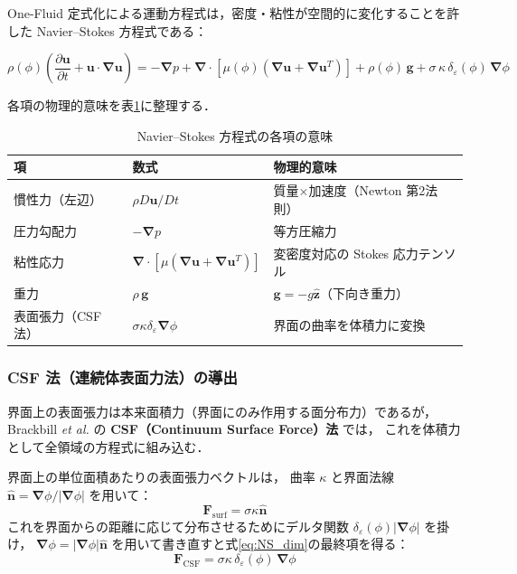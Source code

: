 \documentclass[12pt, a4paper, titlepage]{article}
\newcommand{\jp}[1]{{\normalfont\jpfont #1}}
\newcommand{\pd}[2]{\dfrac{\partial #1}{\partial #2}}
\newcommand{\bu}{\bm{u}}
\newcommand{\bg}{\bm{g}}
\newcommand{\bnabla}{\bm{\nabla}}
\newcommand{\de}{\delta_\varepsilon}
\begin{document}
\jp{One-Fluid 定式化による運動方程式は，密度・粘性が空間的に変化することを許した
Navier--Stokes 方程式である：}

\begin{tcolorbox}[mybox, title={\jp{One-Fluid Navier--Stokes 方程式（次元形）}}]
\begin{equation}
  \rho(\phi)\!\left(\pd{\bu}{t} + \bu\cdot\bnabla\bu\right)
  = -\bnabla p
  + \bnabla\cdot\!\left[\mu(\phi)\!\left(\bnabla\bu + \bnabla\bu^T\right)\right]
  + \rho(\phi)\,\bg
  + \sigma\,\kappa\,\de(\phi)\,\bnabla\phi
  \label{eq:NS_dim}
\end{equation}
\end{tcolorbox}

\jp{各項の物理的意味を表\ref{tab:NS_terms}に整理する．}

\begin{table}[h]
\centering
\caption{\jp{Navier--Stokes 方程式の各項の意味}}
\label{tab:NS_terms}
\begin{tabular}{lll}
\toprule
\jp{項} & \jp{数式} & \jp{物理的意味}\\
\midrule
\jp{慣性力（左辺）} & $\rho D\bu/Dt$ & \jp{質量}$\times$\jp{加速度（Newton 第2法則）}\\
\jp{圧力勾配力} & $-\bnabla p$ & \jp{等方圧縮力}\\
\jp{粘性応力} & $\bnabla\cdot[\mu(\bnabla\bu+\bnabla\bu^T)]$ & \jp{変密度対応の Stokes 応力テンソル}\\
\jp{重力} & $\rho\,\bg$ & \jp{$\bg = -g\hat{\bm{z}}$（下向き重力）}\\
\jp{表面張力（CSF法）} & $\sigma\kappa\de\bnabla\phi$ & \jp{界面の曲率を体積力に変換 \cite{Brackbill1992}}\\
\bottomrule
\end{tabular}
\end{table}

\subsubsection{CSF \jp{法（連続体表面力法）の導出}}

\jp{界面上の表面張力は本来面積力（界面にのみ作用する面分布力）であるが，
Brackbill \textit{et al.} \cite{Brackbill1992} の \textbf{CSF（Continuum Surface Force）法} では，
これを体積力として全領域の方程式に組み込む．}

\jp{界面上の単位面積あたりの表面張力ベクトルは，
曲率 $\kappa$ と界面法線 $\hat{\bm{n}} = \bnabla\phi/|\bnabla\phi|$ を用いて：}
\begin{equation}
  \bm{F}_{\mathrm{surf}} = \sigma\kappa\hat{\bm{n}}
\end{equation}
\jp{これを界面からの距離に応じて分布させるためにデルタ関数 $\de(\phi)|\bnabla\phi|$ を掛け，
$\bnabla\phi = |\bnabla\phi|\hat{\bm{n}}$ を用いて書き直すと式\eqref{eq:NS_dim}の最終項を得る：}
\begin{equation}
  \bm{F}_{\mathrm{CSF}} = \sigma\kappa\,\de(\phi)\,\bnabla\phi
\end{equation}
\end{document}
